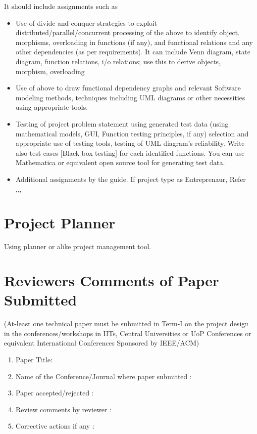 \documentclass[oneside,a4paper,12pt]{report}
\begin{document}
\begin{appendices}
It should include assignments such as
\begin{itemize}
\item Use of divide and conquer strategies to exploit distributed/parallel/concurrent processing of the above to identify object, morphisms, overloading in functions (if any), and functional relations and any other dependencies (as per requirements).
             It can include Venn diagram, state diagram, function relations, i/o relations; use this to derive objects, morphism, overloading

\item Use of above to draw functional dependency graphs and relevant Software modeling methods, techniques
including UML diagrams or other necessities using appropriate tools.
\item Testing of project problem statement using generated test data (using mathematical models, GUI, Function testing principles, if any) selection and appropriate use of testing tools, testing of UML diagram's reliability. Write also test cases [Black box testing] for each identified functions.
You can use Mathematica or equivalent open source tool for generating test data.
\item Additional assignments by the guide. If project type as Entreprenaur, Refer \cite{ehr},\cite{mckinsey},\cite{mckinseyweb}, \cite{govwebsite}
\end{itemize}


\chapter{Project Planner}
\label{app:plan}
Using planner or alike project management tool.




\chapter{Reviewers Comments of Paper Submitted}
(At-least one technical paper must be submitted in Term-I on the project design in the
conferences/workshops in IITs, Central Universities or UoP Conferences or equivalent International Conferences Sponsored by IEEE/ACM)
\begin{enumerate}
\item Paper Title:
\item Name of the Conference/Journal where paper submitted :
\item Paper accepted/rejected :
\item Review comments by reviewer :
\item Corrective actions if any :


\end{enumerate}
\end{appendices}
\end{document}
